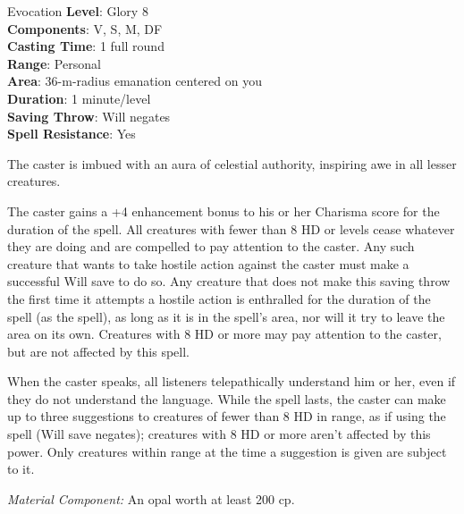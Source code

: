 {Evocation}
{
	\textbf{Level}: Glory 8\\
	\textbf{Components}: V, S, M, DF\\
	\textbf{Casting Time}: 1 full round\\
	\textbf{Range}: Personal\\
	\textbf{Area}: 36-m-radius emanation centered on you\\
	\textbf{Duration}: 1 minute/level\\
	\textbf{Saving Throw}: Will negates\\
	\textbf{Spell Resistance}: Yes\\
}
{
	The caster is imbued with an aura of celestial authority, inspiring awe in all lesser creatures.
	
	The caster gains a +4 enhancement bonus to his or her Charisma score for the duration of the spell. All creatures with fewer than 8 HD or levels cease whatever they are doing and are compelled to pay attention to the caster. Any such creature that wants to take hostile action against the caster must make a successful Will save to do so. Any creature that does not make this saving throw the first time it attempts a hostile action is enthralled for the duration of the spell (as the  spell), as long as it is in the spell's area, nor will it try to leave the area on its own. Creatures with 8 HD or more may pay attention to the caster, but are not affected by this spell.

	When the caster speaks, all listeners telepathically understand him or her, even if they do not understand the language. While the spell lasts, the caster can make up to three suggestions to creatures of fewer than 8 HD in range, as if using the  spell (Will save negates); creatures with 8 HD or more aren't affected by this power. Only creatures within range at the time a suggestion is given are subject to it.

	\textit{Material Component:} An opal worth at least 200 cp.
}